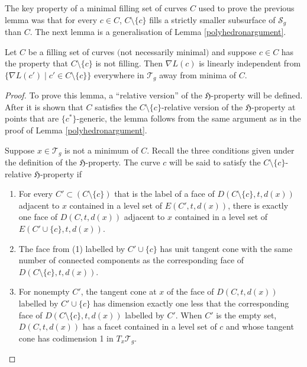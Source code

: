 The key property of a minimal filling set of curves $C$ used to prove the previous lemma was that for every $c\in C$, $C\setminus\{c\}$ fills a strictly smaller subsurface of $\mathcal{S}_{g}$ than $C$. The next lemma is a generalisation of Lemma \ref{polyhedronargument}.

\begin{Lemma}
\label{neededtofill}
Let $C$ be a filling set of curves $($not necessarily minimal$)$ and suppose $c\in C$ has the property that $C\setminus\{c\}$ is not filling. Then $\nabla L(c)$ is linearly independent from $\{\nabla L(c') \mid c'\in C\setminus \{c\}\}$ everywhere in $\mathcal{T}_{g}$ away from minima of $C$.
\end{Lemma}

\begin{proof}
To prove this lemma, a ``relative version'' of the $\mathfrak{H}$-property will be defined. After it is shown that $C$ satisfies the $C\setminus\{c\}$-relative version of the $\mathfrak{H}$-property at points that are $\{c^{*}\}$-generic, the lemma follows from the same argument as in the proof of Lemma \ref{polyhedronargument}.

Suppose $x\in \mathcal{T}_{g}$ is not a minimum of $C$. Recall the three conditions given under the definition of the $\mathfrak{H}$-property. The curve $c$ will be said to satisfy the $C\setminus \{c\}$-relative $\mathfrak{H}$-property if
\begin{enumerate}\itemsep=0pt
\item[(1)] For every $C'\subset (C\setminus \{c\})$ that is the label of a face of $D(C\setminus\{c\},t,d(x))$ adjacent to $x$ contained in a level set of $E(C',t,d(x))$, there is exactly one face of $D(C,t,d(x))$ adjacent to $x$ contained in a level set of $E(C'\cup\{c\},t,d(x))$.
\item[(2)] The face from (1) labelled by $C'\cup\{c\}$ has unit tangent cone with the same number of connected components as the corresponding face of $D(C\setminus\{c\},t,d(x))$.
\item[(3)] For nonempty $C'$, the tangent cone at $x$ of the face of $D(C,t,d(x))$ labelled by $C'\cup \{c\}$ has dimension exactly one less that the corresponding face of $D(C\setminus\{c\},t,d(x))$ labelled by $C'$. When $C'$ is the empty set, $D(C,t,d(x))$ has a facet contained in a level set of $c$ and whose tangent cone has codimension 1 in $T_{x}\mathcal{T}_{g}$.
\end{enumerate}


\end{proof}
